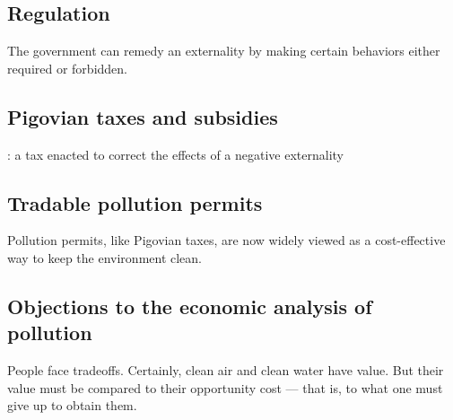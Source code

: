 \subsection{Regulation}

The government can remedy an externality by making certain behaviors either required or forbidden.


\subsection{Pigovian taxes and subsidies}

:
a tax enacted to correct the effects of a negative externality


\subsection{Tradable pollution permits}

Pollution permits, like Pigovian taxes, are now widely viewed as a cost-effective way to keep the environment clean.


\subsection{Objections to the economic analysis of pollution}

People face tradeoffs.
Certainly, clean air and clean water have value. But their value must be compared to their opportunity cost — that is, to what one must give up to obtain them.










